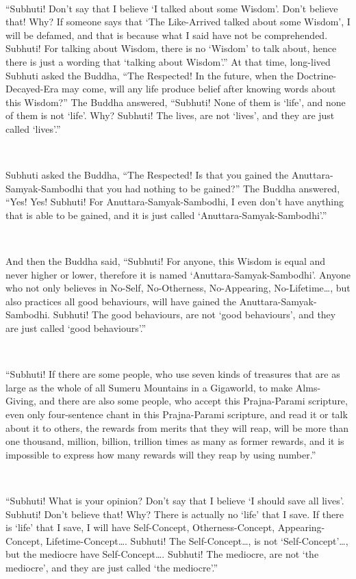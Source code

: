 \documentclass[a5paper,12pt]{book}
\begin{document}
    ~
 
     ``Subhuti! Don't say that I believe `I talked about some Wisdom'. Don't believe that! Why? If someone says that `The Like-Arrived talked about some Wisdom', I will be defamed, and that is because what I said have not be comprehended. Subhuti! For talking about Wisdom, there is no `Wisdom' to talk about, hence there is just a wording that `talking about Wisdom'.'' At that time, long-lived Subhuti asked the Buddha, ``The Respected! In the future, when the Doctrine-Decayed-Era may come, will any life produce belief after knowing words about this Wisdom?'' The Buddha answered, ``Subhuti! None of them is `life', and none of them is not `life'. Why? Subhuti! The lives, are not `lives', and they are just called `lives'.''

    ~

     Subhuti asked the Buddha, ``The Respected! Is that you gained the Anuttara-Samyak-Sambodhi that you had nothing to be gained?'' The Buddha answered, ``Yes! Yes! Subhuti! For Anuttara-Samyak-Sambodhi, I even don't have anything that is able to be gained, and it is just called `Anuttara-Samyak-Sambodhi'.''

    ~

     And then the Buddha said, ``Subhuti! For anyone, this Wisdom is equal and never higher or lower, therefore it is named `Anuttara-Samyak-Sambodhi'. Anyone who not only believes in No-Self, No-Otherness, No-Appearing, No-Lifetime\dots{}, but also practices all good behaviours, will have gained the Anuttara-Samyak-Sambodhi. Subhuti! The good behaviours, are not `good behaviours', and they are just called `good behaviours'.''

    ~

     ``Subhuti! If there are some people, who use seven kinds of treasures that are as large as the whole of all Sumeru Mountains in a Gigaworld, to make Alms-Giving, and there are also some people, who accept this Prajna-Parami scripture, even only four-sentence chant in this Prajna-Parami scripture, and read it or talk about it to others, the rewards from merits that they will reap, will be more than one thousand, million, billion, trillion times as many as former rewards, and it is impossible to express how many rewards will they reap by using number.''

    ~

     ``Subhuti! What is your opinion? Don't say that I believe `I should save all lives'. Subhuti! Don't believe that! Why? There is actually no `life' that I save. If there is `life' that I save, I will have Self-Concept, Otherness-Concept, Appearing-Concept, Lifetime-Concept\dots{}. Subhuti! The Self-Concept\dots{}, is not `Self-Concept'\dots{}, but the mediocre have Self-Concept\dots{}. Subhuti! The mediocre, are not `the mediocre', and they are just called `the mediocre'.''
\end{document}
